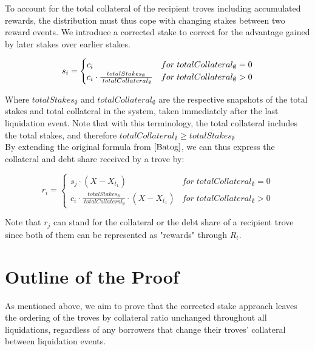 \documentclass[reqno]{article}
\begin{document}
To account for the total collateral of the recipient troves including accumulated rewards, the distribution must thus cope with changing stakes between two reward events. We introduce a corrected stake to correct for the advantage gained by later stakes over earlier stakes.

\begin{equation}
    s_i=
        \begin{cases} 
            c_i & for \;totalCollateral_\emptyset = 0\\
            \mathlarger{c_i} \cdot \frac{totalStakes_\emptyset} {\;totalCollateral_\emptyset} & for \;totalCollateral_\emptyset>0
        \end{cases}
\end{equation}

\bigskip
Where $totalStakes_\emptyset$ and $totalCollateral_\emptyset$ are the respective snapshots of the total stakes and total collateral in the system, taken immediately after the last liquidation event. Note that with this terminology, the total collateral includes the total stakes, and therefore $totalCollateral_\emptyset \ge totalStakes_\emptyset$
\\

By extending the original formula from $\cite{Batog}$, we can thus express the collateral and debt share received by a trove by:

\begin{equation}
    r_i=
        \begin{cases} 
            s_j \cdot (X - X_{t_1}) & for \;totalCollateral_\emptyset = 0\\
            c_i \cdot \frac{totalStakes_\emptyset} {\;totalCollateral_\emptyset} \cdot (X - X_{t_1}) & for \;totalCollateral_\emptyset>0
        \end{cases}
\end{equation}

Note that $r_j$ can stand for the collateral or the debt share of a recipient trove since both of them can be represented as "rewards" through $R_t$.

\section{Outline of the Proof}
As mentioned above, we aim to prove that the corrected stake approach leaves the ordering of the troves by collateral ratio unchanged throughout all liquidations, regardless of any borrowers that change their troves' collateral between liquidation events.
\end{document}
